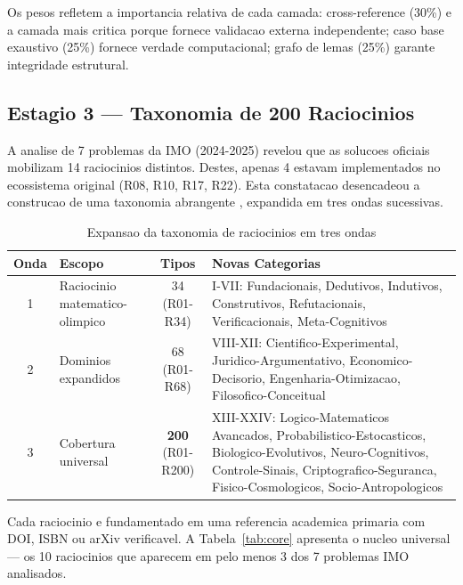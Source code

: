 \documentclass[5p]{elsarticle}
\begin{document}
Os pesos refletem a importancia relativa de cada camada: cross-reference (30\%)
e a camada mais critica porque fornece validacao externa independente; caso
base exaustivo (25\%) fornece verdade computacional; grafo de lemas (25\%)
garante integridade estrutural.

\subsection{Estagio 3 — Taxonomia de 200 Raciocinios}

A analise de 7 problemas da IMO (2024-2025) revelou que as solucoes oficiais
mobilizam 14 raciocinios distintos. Destes, apenas 4 estavam implementados no
ecossistema original (R08, R10, R17, R22). Esta constatacao desencadeou a
construcao de uma taxonomia abrangente \cite{taxonomia200}, expandida em tres
ondas sucessivas.

\begin{table}[H]
  \centering
  \caption{Expansao da taxonomia de raciocinios em tres ondas}
  \label{tab:taxonomia}
  \small
  \begin{tabular}{clcp{4.5cm}}
    \toprule
    \textbf{Onda} & \textbf{Escopo} & \textbf{Tipos} & \textbf{Novas Categorias} \\
    \midrule
    1 & Raciocinio matematico-olimpico & 34 (R01-R34) & I-VII: Fundacionais, Dedutivos, Indutivos, Construtivos, Refutacionais, Verificacionais, Meta-Cognitivos \\
    \rowcolor{bluebg}
    2 & Dominios expandidos & 68 (R01-R68) & VIII-XII: Cientifico-Experimental, Juridico-Argumentativo, Economico-Decisorio, Engenharia-Otimizacao, Filosofico-Conceitual \\
    3 & Cobertura universal & \textbf{200} (R01-R200) & XIII-XXIV: Logico-Matematicos Avancados, Probabilistico-Estocasticos, Biologico-Evolutivos, Neuro-Cognitivos, Controle-Sinais, Criptografico-Seguranca, Fisico-Cosmologicos, Socio-Antropologicos \\
    \bottomrule
  \end{tabular}
\end{table}

Cada raciocinio e fundamentado em uma referencia academica primaria com DOI,
ISBN ou arXiv verificavel. A Tabela~\ref{tab:core} apresenta o nucleo universal
--- os 10 raciocinios que aparecem em pelo menos 3 dos 7 problemas IMO analisados.
\end{document}
